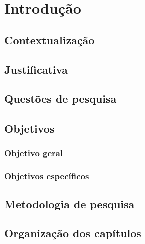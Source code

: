 \chapter[Introdução]{Introdução}




\section{Contextualização}

\section{Justificativa}

\section{Questões de pesquisa}

\section{Objetivos}

\subsection{Objetivo geral}

\subsection{Objetivos específicos}

\section{Metodologia de pesquisa}

\section{Organização dos capítulos}
    






